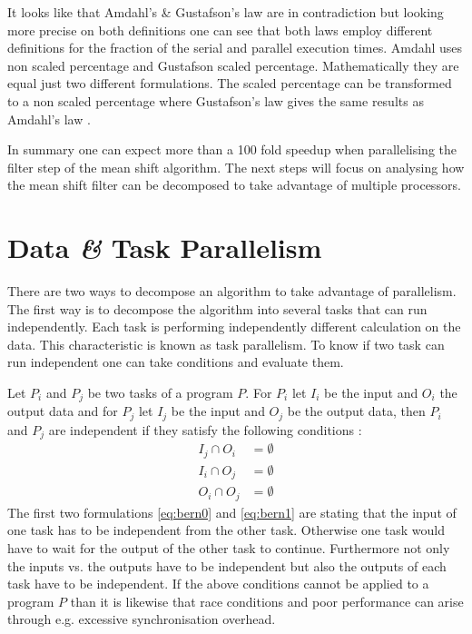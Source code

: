 It looks like that Amdahl's \& Gustafson's law are in contradiction but looking
more precise on both definitions one can see that both laws employ different
definitions for the fraction of the serial and parallel execution times. Amdahl
uses non scaled percentage and Gustafson scaled percentage. Mathematically they
are equal just two different formulations. The scaled percentage can be
transformed to a non scaled percentage where Gustafson's law gives the same
results as Amdahl's law \citep{citeulike:3838998}.

In summary one can expect more than a 100 fold speedup when parallelising the
filter step of the mean shift algorithm. The next steps will focus on analysing
how the mean shift filter can be decomposed to take advantage of multiple
processors.

\section{Data {\itshape{\&}} Task Parallelism} %
\label{sec:data_and_task_parallelism}
There are two ways to decompose an algorithm to take advantage of parallelism.
The first way is to decompose the algorithm into several tasks that can run
independently. Each task is performing independently different calculation on
the data. This characteristic is known as task parallelism. To know if two task
can run independent one can take \citeauthor{citeulike:6113408} conditions and
evaluate them.

Let $P_i$ and $P_j$ be two tasks of a program $P$. For $P_i$ let $I_i$ be the
input and $O_i$ the output data and for $P_j$ let $I_j$ be the input and $O_j$
be the output data, then $P_i$ and $P_j$ are independent if they satisfy the
following conditions
\citep{citeulike:3838998}:
\begin{subequations}\label{eq:bern_cond}
  \begin{align}
    I_j \cap O_i & = \emptyset \label{eq:bern0}\\
    I_i \cap O_j & = \emptyset \label{eq:bern1}\\
    O_i \cap O_j & = \emptyset \label{eq:bern2}
  \end{align}
\end{subequations}
The first two formulations \autoref{eq:bern0} and \autoref{eq:bern1} are stating
that the input of one task has to be independent from the other task. Otherwise
one task would have to wait for the output of the other task to continue.
Furthermore not only the inputs vs. the outputs have to be independent but also
the outputs of each task have to be independent. If the above conditions cannot
be applied to a program $P$ than it is likewise that race conditions and poor
performance can arise through e.g. excessive synchronisation overhead.


